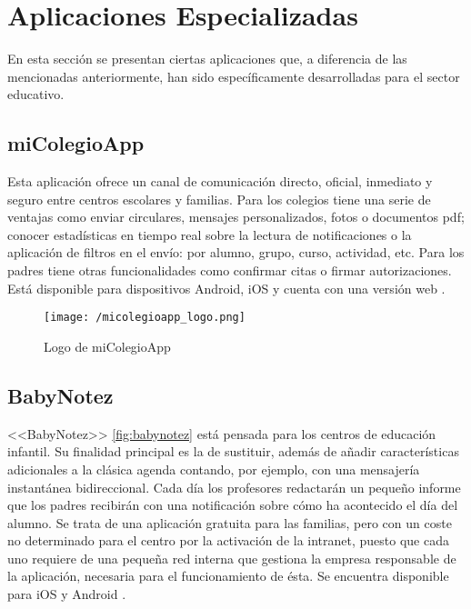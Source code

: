 \newpage

\section{Aplicaciones Especializadas}
En esta sección se presentan ciertas aplicaciones que, a diferencia de las mencionadas anteriormente, han sido específicamente desarrolladas para el sector educativo.

\subsection{miColegioApp}
Esta aplicación ofrece un canal de comunicación directo, oficial, inmediato y seguro entre centros escolares y familias. Para los colegios tiene una serie de ventajas como enviar circulares, mensajes personalizados, fotos o documentos pdf; conocer estadísticas en tiempo real sobre la lectura de notificaciones o la aplicación de filtros en el envío: por alumno, grupo, curso, actividad, etc. Para los padres tiene otras funcionalidades como confirmar citas o firmar autorizaciones. Está disponible para dispositivos Android, iOS y cuenta con una versión web \cite{creaTactil}.

\begin{figure}[!h]
	\begin{center}
		\texttt{[image: /micolegioapp\_logo.png]}
		\caption{Logo de miColegioApp}
		\label{fig:micolegioapp}
	\end{center}
\end{figure}

\subsection{BabyNotez}
<<BabyNotez>> \ref{fig:babynotez} está pensada para los centros de educación infantil. Su finalidad principal es la de sustituir, además de añadir características adicionales a la clásica agenda contando, por ejemplo, con una mensajería instantánea bidireccional. Cada día los profesores redactarán un pequeño informe que los padres recibirán con una notificación sobre cómo ha acontecido el día del alumno. Se trata de una aplicación gratuita para las familias, pero con un coste no determinado para el centro por la activación de la intranet, puesto que cada uno requiere de una pequeña red interna que gestiona la empresa responsable de la aplicación, necesaria para el funcionamiento de ésta. Se encuentra disponible para iOS y Android \cite{Educo2016}.

